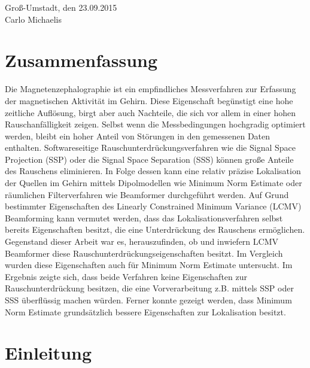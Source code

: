 \documentclass[doc,a4paper,12pt]{apa6}
\begin{document}
\vspace{3em}
\noindent Groß-Umstadt, den 23.09.2015\\ Carlo Michaelis

\newpage

\section*{Zusammenfassung}

Die Magnetenzephalographie ist ein empfindliches Messverfahren zur Erfassung der magnetischen Aktivität im Gehirn. Diese Eigenschaft begünstigt eine hohe zeitliche Auflösung, birgt aber auch Nachteile, die sich vor allem in einer hohen Rauschanfälligkeit zeigen. Selbst wenn die Messbedingungen hochgradig optimiert werden, bleibt ein hoher Anteil von Störungen in den gemessenen Daten enthalten. Softwareseitige Rauschunterdrückungsverfahren wie die Signal Space Projection (SSP) oder die Signal Space Separation (SSS) können große Anteile des Rauschens eliminieren. In Folge dessen kann eine relativ präzise Lokalisation der Quellen im Gehirn mittels Dipolmodellen wie Minimum Norm Estimate oder räumlichen Filterverfahren wie Beamformer durchgeführt werden. Auf Grund bestimmter Eigenschaften des Linearly Constrained Minimum Variance (LCMV) Beamforming kann vermutet werden, dass das Lokalisationsverfahren selbst bereits Eigenschaften besitzt, die eine Unterdrückung des Rauschens ermöglichen. Gegenstand dieser Arbeit war es, herauszufinden, ob und inwiefern LCMV Beamformer diese Rauschunterdrückungseigenschaften besitzt. Im Vergleich wurden diese Eigenschaften auch für Minimum Norm Estimate untersucht. Im Ergebnis zeigte sich, dass beide Verfahren keine Eigenschaften zur Rauschunterdrückung besitzen, die eine Vorverarbeitung z.B. mittels SSP oder SSS überflüssig machen würden. Ferner konnte gezeigt werden, dass Minimum Norm Estimate grundsätzlich bessere Eigenschaften zur Lokalisation besitzt.

\newpage

\setcounter{tocdepth}{2}
\tableofcontents
\newpage

\listoffigures
\newpage

\section{Einleitung}
\end{document}
